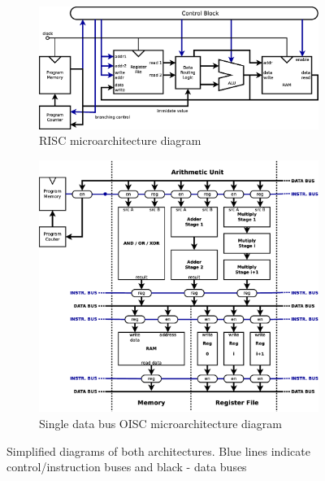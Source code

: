 \documentclass[a4paper,12pt]{article}
\begin{document}
\begin{figure}[t!]
	\centering
	\begin{subfigure}[b]{1\textwidth}
		\includegraphics[width=\linewidth]{graphics/risc.eps}
		\caption{RISC microarchitecture diagram}
		\label{fig:risc_simple}
	\end{subfigure}
	
	\begin{subfigure}[b]{1\textwidth}
		\includegraphics[width=\linewidth]{graphics/oisc.eps}
		\caption{Single data bus OISC microarchitecture diagram}
		\label{fig:oisc_simple}
	\end{subfigure}
	
	\caption{Simplified diagrams of both architectures. Blue lines indicate control/instruction buses and black - data buses}
	\label{fig:simple_blocks}
\end{figure}
\newpage
\end{document}
